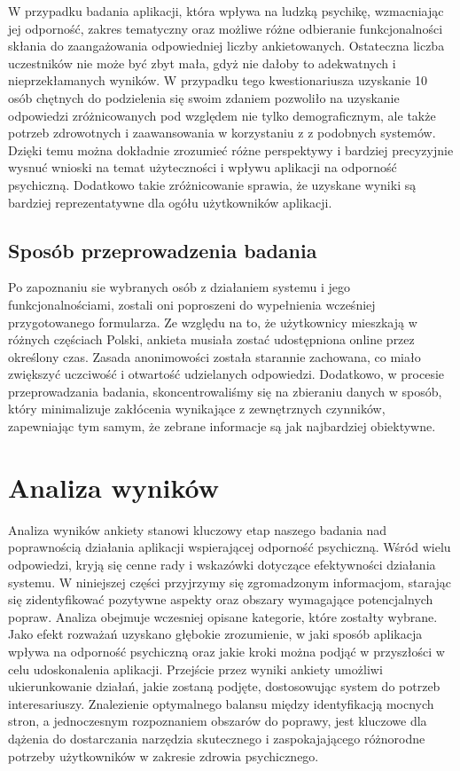 W przypadku badania aplikacji, która wpływa na ludzką psychikę, wzmacniając jej
odporność, zakres tematyczny oraz możliwe różne odbieranie funkcjonalności
skłania do zaangażowania odpowiedniej liczby ankietowanych. Ostateczna liczba
uczestników nie może być zbyt mała, gdyż nie dałoby to adekwatnych i
nieprzekłamanych wyników. W przypadku tego kwestionariusza uzyskanie 10 osób
chętnych do podzielenia się swoim zdaniem pozwoliło na uzyskanie odpowiedzi
zróżnicowanych pod względem nie tylko demograficznym, ale także potrzeb
zdrowotnych i zaawansowania w korzystaniu z z podobnych systemów. Dzięki temu
można dokładnie zrozumieć różne perspektywy i bardziej precyzyjnie wysnuć
wnioski na temat użyteczności i wpływu aplikacji na odporność psychiczną.
Dodatkowo takie zróżnicowanie sprawia, że uzyskane wyniki są bardziej
reprezentatywne dla ogółu użytkowników aplikacji.

\subsection{Sposób przeprowadzenia badania}
Po zapoznaniu sie wybranych osób z działaniem systemu i jego funkcjonalnościami,
zostali oni poproszeni do wypełnienia wcześniej przygotowanego formularza. Ze
względu na to, że użytkownicy mieszkają w różnych częściach Polski, ankieta
musiała zostać udostępniona online przez określony czas. Zasada anonimowości
została starannie zachowana, co miało zwiększyć uczciwość i otwartość
udzielanych odpowiedzi. Dodatkowo, w procesie przeprowadzania badania,
skoncentrowaliśmy się na zbieraniu danych w sposób, który minimalizuje
zakłócenia wynikające z zewnętrznych czynników, zapewniając tym samym, że
zebrane informacje są jak najbardziej obiektywne.



\section{Analiza wyników}
Analiza wyników ankiety stanowi kluczowy etap naszego badania nad poprawnością
działania aplikacji wspierającej odporność psychiczną. Wśród wielu odpowiedzi,
kryją się cenne rady i wskazówki dotyczące efektywności działania systemu. W
niniejszej części przyjrzymy się zgromadzonym informacjom, starając się
zidentyfikować pozytywne aspekty oraz obszary wymagające potencjalnych popraw.
Analiza obejmuje wczesniej opisane kategorie, które zostałty wybrane. Jako efekt
rozważań uzyskano głębokie zrozumienie, w jaki sposób aplikacja wpływa na
odporność psychiczną oraz jakie kroki można podjąć w przyszłości w celu
udoskonalenia aplikacji. Przejście przez wyniki ankiety umożliwi ukierunkowanie
działań, jakie zostaną podjęte, dostosowując system do potrzeb interesariuszy.
Znalezienie optymalnego balansu między identyfikacją mocnych stron, a
jednoczesnym rozpoznaniem obszarów do poprawy, jest kluczowe dla dążenia do
dostarczania narzędzia skutecznego i zaspokajającego różnorodne potrzeby
użytkowników w zakresie zdrowia psychicznego. 

